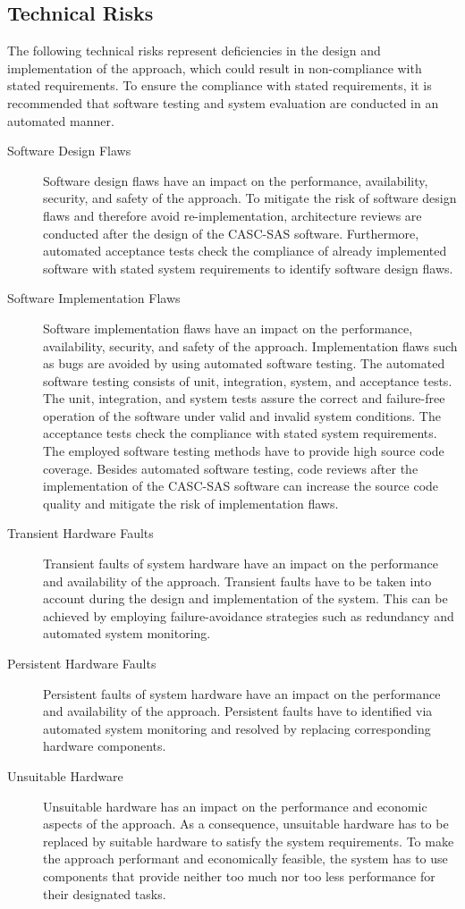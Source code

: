 \subsection{Technical Risks}
\label{sec:risk_assessment_technical}
The following technical risks represent deficiencies in the design and implementation of the approach, which could result in non-compliance with stated requirements.
To ensure the compliance with stated requirements, it is recommended that software testing and system evaluation are conducted in an automated manner.
\begin{description}
    \item[Software Design Flaws] Software design flaws have an impact on the performance, availability, security, and safety of the approach.
    To mitigate the risk of software design flaws and therefore avoid re-implementation, architecture reviews are conducted after the design of the CASC-SAS software.
    Furthermore, automated acceptance tests check the compliance of already implemented software with stated system requirements to identify software design flaws.
    \item[Software Implementation Flaws] Software implementation flaws have an impact on the performance, availability, security, and safety of the approach.
    Implementation flaws such as bugs are avoided by using automated software testing.
    The automated software testing consists of unit, integration, system, and acceptance tests.
    The unit, integration, and system tests assure the correct and failure-free operation of the software under valid and invalid system conditions.
    The acceptance tests check the compliance with stated system requirements.
    The employed software testing methods have to provide high source code coverage.
    Besides automated software testing, code reviews after the implementation of the CASC-SAS software can increase the source code quality and mitigate the risk of implementation flaws.
    \item[Transient Hardware Faults] Transient faults of system hardware have an impact on the performance and availability of the approach.
    Transient faults have to be taken into account during the design and implementation of the system.
    This can be achieved by employing failure-avoidance strategies such as redundancy and automated system monitoring.
    \item[Persistent Hardware Faults] Persistent faults of system hardware have an impact on the performance and availability of the approach.
    Persistent faults have to identified via automated system monitoring and resolved by replacing corresponding hardware components.
    \item[Unsuitable Hardware] Unsuitable hardware has an impact on the performance and economic aspects of the approach.
    As a consequence, unsuitable hardware has to be replaced by suitable hardware to satisfy the system requirements.
    To make the approach performant and economically feasible, the system has to use components that provide neither too much nor too less performance for their designated tasks.
\end{description}


